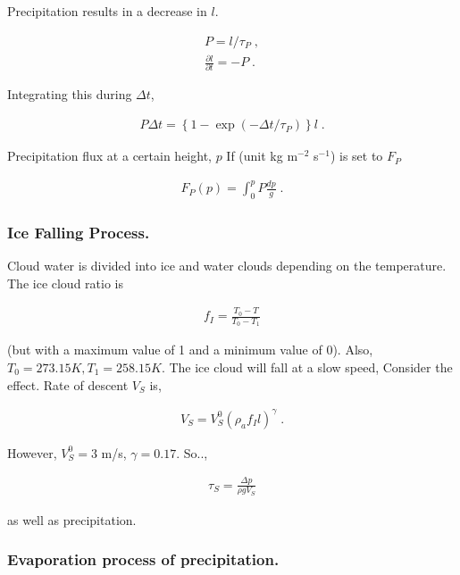 Precipitation results in a decrease in \(l\).

\begin{eqnarray}
  P          =  l / \tau_P \; , \\
  \frac{\partial l}{\partial t}  =  -P \; .
\end{eqnarray}

Integrating this during \(\Delta t\),

\begin{eqnarray}
  P \Delta t  =  \left\{ 1- \exp(- \Delta t/\tau_P) \right\} l \; .
\end{eqnarray}

Precipitation flux at a certain height, \(p\) If (unit kg m\(^{-2}\)
s\(^{-1}\)) is set to \(F_P\)

\begin{eqnarray}
  F_P(p) = \int_0^p P \frac{dp}{g} \; .
\end{eqnarray}

\hypertarget{ice-falling-process.}{%
\subsubsection{Ice Falling Process.}\label{ice-falling-process.}}

Cloud water is divided into ice and water clouds depending on the
temperature. The ice cloud ratio is

\begin{eqnarray}
   f_I = \frac{ T_0 - T }{ T_0 - T_1 }
\end{eqnarray}

(but with a maximum value of 1 and a minimum value of 0). Also,
\(T_0 = 273.15{K}, T_1 = 258.15{K}\). The ice cloud will fall at a slow
speed, Consider the effect. Rate of descent \(V_S\) is,

\begin{eqnarray}
  V_S = V_S^0 ( \rho_a f_I l )^\gamma \; .
\end{eqnarray}

However, \(V_S^0=3\) m/s, \(\gamma=0.17\). So..,

\begin{eqnarray}
  \tau_S = \frac{\Delta p}{\rho g V_S}
\end{eqnarray}

as well as precipitation.

\hypertarget{evaporation-process-of-precipitation.}{%
\subsubsection{Evaporation process of
precipitation.}\label{evaporation-process-of-precipitation.}}

